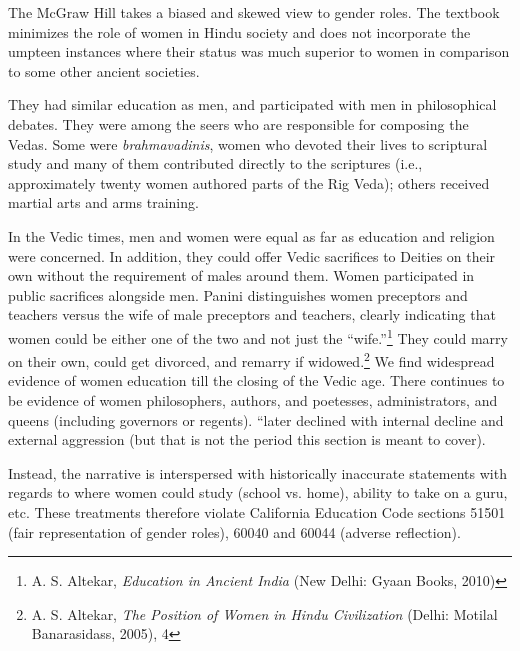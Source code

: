 The McGraw Hill takes a biased and skewed view to gender roles. The textbook minimizes the role of women in Hindu society and does not incorporate the umpteen instances where their status was much superior to women in comparison to some other ancient societies.  

They had similar education as men, and participated with men in philosophical debates. They were among the seers who are responsible for composing the Vedas. Some were \textit{brahmavadinis},  women who devoted their lives to scriptural study and many of them contributed directly to the scriptures (i.e., approximately twenty women authored parts of the Rig Veda); others received martial arts and arms training.

In the Vedic times, men and women were equal as far as education and religion were concerned. In addition, they could offer Vedic sacrifices to Deities on their own without the requirement of males around them. Women participated in public sacrifices alongside men. Panini distinguishes women preceptors and teachers versus the wife of male preceptors and teachers, clearly indicating that women could be either one of the two and not just the “wife.”\footnote{A. S. Altekar, \textit{Education in Ancient India} (New Delhi: Gyaan Books, 2010)} They could marry on their own, could get divorced, and remarry if widowed.\footnote{A. S. Altekar, \textit{The Position of Women in Hindu Civilization} (Delhi: Motilal Banarasidass, 2005), 4} We find widespread evidence of women education till the closing of the Vedic age. There continues to be evidence of women philosophers, authors, and poetesses, administrators, and queens (including governors or regents). “later declined with internal decline and external aggression (but that is not the period this section is meant to cover).

Instead, the narrative is interspersed with historically inaccurate statements with regards to where women could study (school vs. home), ability to take on a guru, etc. These treatments therefore violate California Education Code sections 51501 (fair representation of gender roles), 60040 and 60044 (adverse reflection).  

